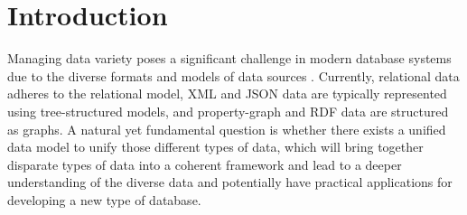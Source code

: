 
\section{Introduction}

 

Managing data variety poses a significant challenge in modern database systems due to the diverse formats and models of data sources \cite{Lu:2019:MDN:3341324.3323214,journals/pvldb/KiehnSGPWWPR22}. Currently, relational data adheres to the relational model, XML and JSON data are typically represented using tree-structured models, and property-graph and RDF data are structured as graphs. A natural yet fundamental question is whether there exists a unified data model to unify those different types of data, which will bring together disparate types of data into a coherent framework and lead to a deeper understanding of the diverse data and potentially have practical applications for developing a new type of database.








